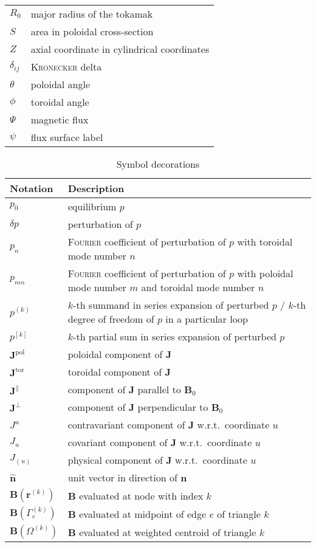 \documentclass[a4paper, twoside, 10pt, english]{article}
\numberwithin{equation}{section}
\let\temp\varrho
\let\varrho\rho
\let\rho\temp
\let\temp\vartheta
\let\vartheta\theta
\let\theta\temp
\let\temp\varphi
\let\varphi\phi
\let\phi\temp
\let\vec\symbf
\newcommand*\pol{\ensuremath{\textrm{pol}}}  %
\newcommand*\tor{\ensuremath{\textrm{tor}}}  %
\begin{document}
\begin{longtable}{l >{\RaggedRight}p{}}
  $R_{0}$ & major radius of the tokamak \\
  $S$ & area in poloidal cross-section \\
  $Z$ & axial coordinate in cylindrical coordinates \\
  $\delta_{ij}$ & \textsc{Kronecker} delta \\
  $\theta$ & poloidal angle \\
  $\phi$ & toroidal angle \\
  $\Psi$ & magnetic flux \\
  $\psi$ & flux surface label \\
  \bottomrule
\end{longtable}

\begin{longtable}{l >{\RaggedRight}p{}}
  \caption{Symbol decorations} \\
  \toprule
  \textbf{Notation} & \textbf{Description} \\
  \midrule
  \endhead
  \label{tab:decorations}%
  $p_{0}$ & equilibrium $p$ \\
  $\delta p$ & perturbation of $p$ \\
  $p_{n}$ & \textsc{Fourier} coefficient of perturbation of $p$ with toroidal mode number $n$ \\
  $p_{m n}$ & \textsc{Fourier} coefficient of perturbation of $p$ with poloidal mode number $m$ and toroidal mode number $n$ \\
  $p^{(k)}$ & $k$-th summand in series expansion of perturbed $p$ / $k$-th degree of freedom of $p$ in a particular loop \\
  $p^{[k]}$ & $k$-th partial sum in series expansion of perturbed $p$ \\
  \midrule
  $\vec{J}^{\pol}$ & poloidal component of $\vec{J}$ \\
  $\vec{J}^{\tor}$ & toroidal component of $\vec{J}$ \\
  $\vec{J}^{\parallel}$ & component of $\vec{J}$ parallel to $\vec{B}_{0}$ \\
  $\vec{J}^{\perp}$ & component of $\vec{J}$ perpendicular to $\vec{B}_{0}$ \\
  $J^{u}$ & contravariant component of $\vec{J}$ w.r.t.\ coordinate $u$ \\
  $J_{u}$ & covariant component of $\vec{J}$ w.r.t.\ coordinate $u$ \\
  $J_{(u)}$ & physical component of $\vec{J}$ w.r.t.\ coordinate $u$ \\
  $\hat{\vec{n}}$ & unit vector in direction of $\vec{n}$ \\
  \midrule
  $\vec{B} (\vec{r}^{(k)})$ & $\vec{B}$ evaluated at node with index $k$ \\
  $\vec{B} (\Gamma_{e}^{(k)})$ & $\vec{B}$ evaluated at midpoint of edge $e$ of triangle $k$ \\
  $\vec{B} (\Omega^{(k)})$ & $\vec{B}$ evaluated at weighted centroid of triangle $k$ \\
  \bottomrule
\end{longtable}
\end{document}
